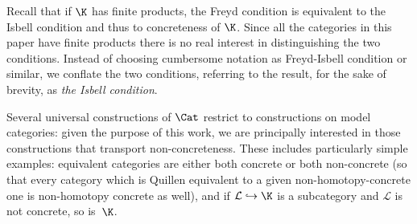 \begin{remark}
Recall that if $\K$ has finite products, the Freyd condition is equivalent to the Isbell condition and thus to concreteness of $\K$. Since all the categories in this paper have finite products there is no real interest in distinguishing the two conditions. Instead of choosing cumbersome notation as Freyd-Isbell condition or similar, we conflate the two conditions, referring to the result, for the sake of brevity, as \emph{the Isbell condition}.
\end{remark}
Several universal constructions of $\Cat$ restrict to constructions on model categories: given the purpose of this work, we are principally interested in those constructions that transport non-concreteness. These includes particularly simple examples: equivalent categories are either both concrete or both non-concrete (so that every category which is Quillen equivalent to a given non-homotopy\hyp{}concrete one is non-homotopy concrete as well), and if $\mathcal{L}\hookrightarrow \K$ is a subcategory and $\mathcal{L}$ is not concrete, so is~$\K$.


